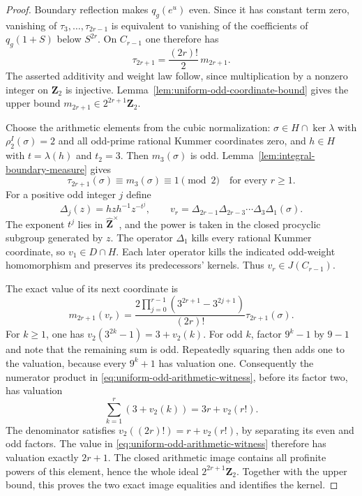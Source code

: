 \begin{proof}
Boundary reflection makes $q_g(e^u)$ even. Since it has constant
term zero, vanishing of $\tau_3,\ldots,\tau_{2r-1}$ is equivalent
to vanishing of the coefficients of $q_g(1+S)$ below $S^{2r}$.
On $C_{r-1}$ one therefore has
\[
 \tau_{2r+1}=\frac{(2r)!}{2}\,m_{2r+1}.
\]
The asserted additivity and weight law follow, since multiplication
by a nonzero integer on $\mathbf Z_2$ is injective.
Lemma~\ref{lem:uniform-odd-coordinate-bound} gives the upper bound
$m_{2r+1}\in2^{2r+1}\mathbf Z_2$.

Choose the arithmetic elements from the cubic normalization: $\sigma\in H\cap\ker\lambda$ with
$\rho_2^I(\sigma)=2$ and all odd-prime rational Kummer coordinates
zero, and $h\in H$ with $t=\lambda(h)$ and $t_2=3$.
Then $m_3(\sigma)$ is odd. Lemma~\ref{lem:integral-boundary-measure}
gives
\[
 \tau_{2r+1}(\sigma)\equiv m_3(\sigma)\equiv1\pmod2
 \quad\text{for every }r\ge1.
\]
For a positive odd integer $j$ define
\[
 \Delta_j(z)=hzh^{-1}z^{-t^j},\qquad
 v_r=\Delta_{2r-1}\Delta_{2r-3}\cdots\Delta_3\Delta_1(\sigma).
\]
The exponent $t^j$ lies in $\widehat{\mathbf Z}^{\times}$, and the
power is taken in the closed procyclic subgroup generated by $z$.
The operator $\Delta_1$ kills every rational Kummer coordinate,
so $v_1\in D\cap H$. Each later operator kills the indicated
odd-weight homomorphism and preserves its predecessors' kernels.
Thus $v_r\in J(C_{r-1})$.

The exact value of its next coordinate is
\begin{equation}\label{eq:uniform-odd-arithmetic-witness}
 m_{2r+1}(v_r)=
 \frac{2\prod_{j=0}^{r-1}(3^{2r+1}-3^{2j+1})}{(2r)!}
                         \tau_{2r+1}(\sigma).
\end{equation}
For $k\ge1$, one has
$v_2(3^{2k}-1)=3+v_2(k)$.
For odd $k$, factor $9^k-1$ by $9-1$ and note that the remaining
sum is odd. Repeatedly squaring then adds one to the valuation,
because every $9^k+1$ has valuation one. Consequently the numerator
product in \eqref{eq:uniform-odd-arithmetic-witness}, before its
factor two, has valuation
\[
 \sum_{k=1}^{r}(3+v_2(k))=3r+v_2(r!).
\]
The denominator satisfies
$v_2((2r)!)=r+v_2(r!)$, by separating its even and odd factors.
The value in \eqref{eq:uniform-odd-arithmetic-witness} therefore has
valuation exactly $2r+1$. The closed arithmetic image contains all
profinite powers of this element, hence the whole ideal
$2^{2r+1}\mathbf Z_2$. Together with the upper bound, this proves
the two exact image equalities and identifies the kernel.


\end{proof}
